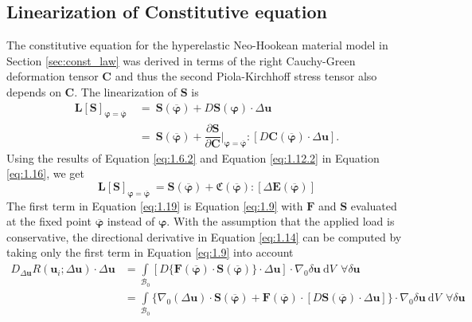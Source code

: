 \subsection{\textbf{Linearization of Constitutive equation}}
The constitutive equation for the hyperelastic Neo-Hookean material model in Section \eqref{sec:const_law} was derived in terms of the right Cauchy-Green deformation tensor $\mathbf{C}$ and thus the second Piola-Kirchhoff stress tensor also depends on $\mathbf{C}$. The linearization of $\mathbf{S}$ is
\begin{align}
\mathbf{L}\left[ \mathbf{S} \right]_{\bm{\varphi} = \overline{\bm{\varphi}}} \ &= \ \mathbf{S}(\overline{\bm{\varphi}}) + D \mathbf{S}(\bm{\varphi}) \cdot \Delta\mathbf{u} \nonumber \\
&= \ \mathbf{S}(\overline{\bm{\varphi}}) + \dfrac{\partial \mathbf{S}}{\partial \mathbf{C}} \Big|_{\bm{\varphi} = \overline{\bm{\varphi}}} : \left[ D \mathbf{C}(\overline{\bm{\varphi}}) \cdot \Delta\mathbf{u} \right].
\label{eq:1.16}
\end{align}
Using the results of Equation \eqref{eq:1.6.2} and Equation \eqref{eq:1.12.2} in Equation \eqref{eq:1.16}, we get
\begin{equation}
\mathbf{L}\left[ \mathbf{S} \right]_{\bm{\varphi} = \overline{\bm{\varphi}}} \ = \mathbf{S}(\overline{\bm{\varphi}}) + \mathfrak{C}(\overline{\bm{\varphi}}) : \left[ \Delta \mathbf{E}(\overline{\bm{\varphi}}) \right]
\label{eq:1.19}
\end{equation} \newline 
The first term in Equation \eqref{eq:1.19} is Equation \eqref{eq:1.9} with $\mathbf{F}$ and $\mathbf{S}$ evaluated at the fixed point $\overline{\bm{\varphi}}$ instead of $\bm{\varphi}$. With the assumption that the applied load is conservative, the directional derivative in Equation \eqref{eq:1.14} can be computed by taking only the first term in Equation \eqref{eq:1.9} into account
\begin{align}
D_{\Delta\mathbf{u}} R(\mathbf{u}_i; \Delta \mathbf{u}) \cdot \Delta\mathbf{u} &= \int\limits_{\mathcal{B}_0} \left[ D \{ \mathbf{F}(\overline{\bm{\varphi}}) \cdot \mathbf{S}(\overline{\bm{\varphi}})\} \cdot \Delta\mathbf{u} \right] \cdot \nabla_0 \delta\mathbf{u} \ \mathrm{d}V \ \ \forall \delta\mathbf{u} \nonumber \\
&= \int\limits_{\mathcal{B}_0} \Big\lbrace \nabla_0 (\Delta\mathbf{u}) \cdot \mathbf{S}(\overline{\bm{\varphi}}) + \mathbf{F}(\overline{\bm{\varphi}}) \cdot \left[ D \mathbf{S}(\overline{\bm{\varphi}}) \cdot \Delta\mathbf{u} \right] \Big\rbrace \cdot \nabla_0 \delta\mathbf{u} \ \mathrm{d}V \ \ \forall \delta\mathbf{u}
\label{eq:1.20}
\end{align}

